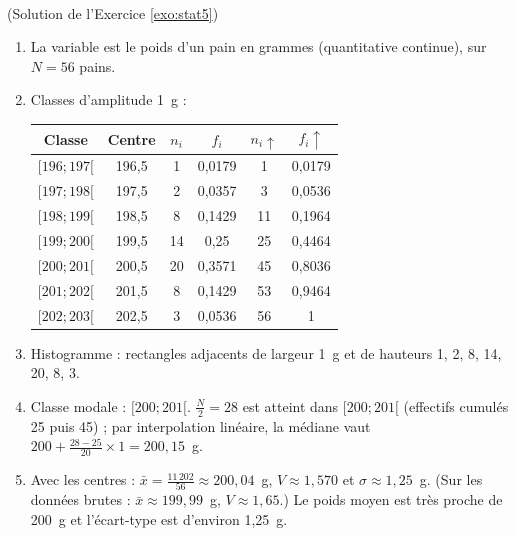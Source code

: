 \begin{corrige}
\begin{sol} ~ \\
(Solution de l'Exercice \ref{exo:stat5})
\begin{enumerate}
\item La variable est le poids d'un pain en grammes (quantitative continue), sur $N = 56$ pains.
\item Classes d'amplitude 1~g :
      \begin{center}
      \begin{tabular}{|c|c|c|c|c|c|}
      \hline
      Classe & Centre & $n_i$ & $f_i$ & $n_i\uparrow$ & $f_i\uparrow$ \\
      \hline
      $[196 ; 197[$ & 196,5 & 1 & 0,0179 & 1 & 0,0179 \\
      $[197 ; 198[$ & 197,5 & 2 & 0,0357 & 3 & 0,0536 \\
      $[198 ; 199[$ & 198,5 & 8 & 0,1429 & 11 & 0,1964 \\
      $[199 ; 200[$ & 199,5 & 14 & 0,25 & 25 & 0,4464 \\
      $[200 ; 201[$ & 200,5 & 20 & 0,3571 & 45 & 0,8036 \\
      $[201 ; 202[$ & 201,5 & 8 & 0,1429 & 53 & 0,9464 \\
      $[202 ; 203[$ & 202,5 & 3 & 0,0536 & 56 & 1 \\
      \hline
      \end{tabular}
      \end{center}
\item Histogramme : rectangles adjacents de largeur 1~g et de hauteurs 1, 2, 8, 14, 20, 8, 3.
\item Classe modale : $[200 ; 201[$. $\frac{N}{2} = 28$ est atteint dans $[200 ; 201[$ (effectifs cumul\'es 25 puis 45) ;
      par interpolation lin\'eaire, la m\'ediane vaut $200 + \frac{28 - 25}{20} \times 1 = 200,15$~g.
\item Avec les centres : $\bar{x} = \frac{11\,202}{56} \approx 200,04$~g, $V \approx 1,570$ et $\sigma \approx 1,25$~g.
      (Sur les donn\'ees brutes : $\bar{x} \approx 199,99$~g, $V \approx 1,65$.)
      Le poids moyen est tr\`es proche de 200~g et l'\'ecart-type est d'environ 1,25~g.
\end{enumerate}
\end{sol}


\end{corrige}
